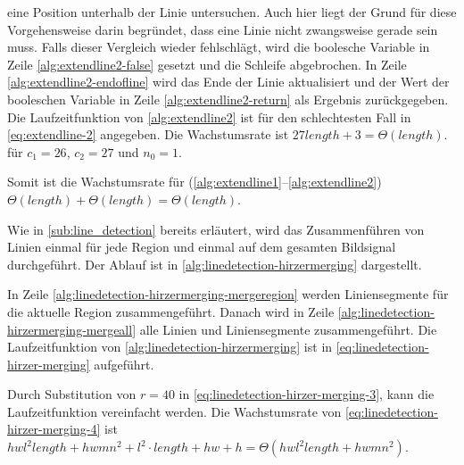  eine Position unterhalb der Linie untersuchen. Auch hier liegt der Grund für diese Vorgehensweise darin begründet, dass
 eine Linie nicht zwangsweise gerade sein muss. Falls dieser Vergleich wieder fehlschlägt, wird die boolesche Variable
 in Zeile \ref{alg:extendline2-false} gesetzt und die Schleife abgebrochen. In Zeile
 \ref{alg:extendline2-endofline} wird das Ende der Linie aktualisiert und der Wert der booleschen Variable in Zeile
 \ref{alg:extendline2-return} als Ergebnis zurückgegeben. Die Laufzeitfunktion von \autoref{alg:extendline2} ist für
 den schlechtesten Fall in \autoref{eq:extendline-2} angegeben. Die Wachstumsrate ist
 $27 \mathit{length} + 3 = \Theta(\mathit{length})$. für $c_{1} = 26$, $c_{2} = 27$ und $n_{0} = 1$.

Somit ist die Wachstumsrate für  (\autoref{alg:extendline1}--\autoref{alg:extendline2})
 $\Theta(\mathit{length}) + \Theta(\mathit{length}) = \Theta(\mathit{length})$.

Wie in \autoref{sub:line_detection} bereits erläutert, wird das Zusammenführen von Linien einmal für jede Region und
 einmal auf dem gesamten Bildsignal durchgeführt. Der Ablauf ist in \autoref{alg:linedetection-hirzermerging}
 dargestellt.

In Zeile \ref{alg:linedetection-hirzermerging-mergeregion} werden Liniensegmente für die aktuelle Region
 zusammengeführt. Danach wird in Zeile \ref{alg:linedetection-hirzermerging-mergeall} alle Linien und Liniensegmente
 zusammengeführt. Die Laufzeitfunktion von \autoref{alg:linedetection-hirzermerging} ist in
 \autoref{eq:linedetection-hirzer-merging} aufgeführt.

Durch Substitution von $r = 40$ in \autoref{eq:linedetection-hirzer-merging-3}, kann die Laufzeitfunktion vereinfacht
 werden. Die Wachstumsrate von \autoref{eq:linedetection-hirzer-merging-4} ist
$hwl^2\mathit{length} + hwmn^2 + l^2\cdot\mathit{length} + hw + h = \Theta(hwl^2\mathit{length} + hwmn^2)$.